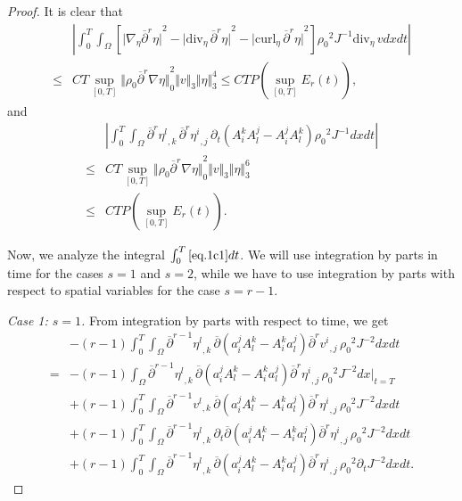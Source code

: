 \documentclass[12pt,twoside,reqno]{amsart}
\numberwithin{equation}{section}
\theoremstyle{definition}
\theoremstyle{remark}
\begin{document}
\begin{proof}
It is clear that
\begin{align*}
  &{\left\vert{{\int_0^T\!\!\!\!\int_\Omega }  \left[{\vert{{\nabla}_\eta {\overline{\partial}}^r\eta}\vert}^2-{\vert{{\mathrm{div}_{\!\eta}\,} {\overline{\partial}}^r \eta}\vert}^2-{\vert{{\mathrm{curl}_\eta\,} {\overline{\partial}}^r \eta}\vert}^2\right]{\rho_0}^2  J^{-1}{\mathrm{div}_{\!\eta}\,} vdxdt}\right\vert}\\
  {\leqslant}& CT\sup_{[0,T]}{\Vert{{\rho_0}  {\overline{\partial}}^r{\nabla}\eta}\Vert}_0^2{\Vert{v}\Vert}_3{\Vert{\eta}\Vert}_3^4
  {\leqslant} CTP(\sup_{[0,T]}E_r(t)),
\end{align*}
and
\begin{align*}
  &{\left\vert{{\int_0^T\!\!\!\!\int_\Omega }  {\overline{\partial}}^r{{{\eta^l}}_{,{k}}\,} {\overline{\partial}}^r {{{\eta^i}}_{,{j}}\,}{\partial}_t(A_i^k A_l^j-A_i^jA_l^k){\rho_0}^2  J^{-1}dxdt}\right\vert}\\
  {\leqslant}& CT\sup_{[0,T]}{\Vert{{\rho_0}  {\overline{\partial}}^r{\nabla}\eta}\Vert}_0^2{\Vert{v}\Vert}_3{\Vert{\eta}\Vert}_3^6\\
  {\leqslant} &CTP(\sup_{[0,T]}E_r(t)).
\end{align*}

Now, we analyze the integral $\int_0^T\eqref{eq.1c1}dt$. We will use integration by parts in time for the cases $s=1$ and $s=2$, while we have to use integration by parts with respect to spatial variables for the case $s=r-1$.

\emph{Case 1: $s=1$.}
From integration by parts with respect to time,  we get
\begin{align}
 &-(r-1){\int_0^T\!\!\!\!\int_\Omega }  {\overline{\partial}}^{r-1}{{{\eta^l}}_{,{k}}\,}{\overline{\partial}} \left(a^j_iA^k_l-A^k_ia^j_l\right){{{{\overline{\partial}}^r v^i}}_{,{j}}\,}{\rho_0}^2  J^{-2}dxdt\label{eq.1c10}\\
  =&-(r-1)\int_\Omega{\overline{\partial}}^{r-1}{{{\eta^l}}_{,{k}}\,}{\overline{\partial}} \left(a^j_iA^k_l-A^k_ia^j_l\right){{{{\overline{\partial}}^r \eta^i}}_{,{j}}\,}{\rho_0}^2  J^{-2}dx\Big|_{t=T}\label{eq.1c11}\\
  &+(r-1){\int_0^T\!\!\!\!\int_\Omega }  {\overline{\partial}}^{r-1}{{{v^l}}_{,{k}}\,}{\overline{\partial}} \left(a^j_iA^k_l-A^k_ia^j_l\right){{{{\overline{\partial}}^r \eta^i}}_{,{j}}\,}{\rho_0}^2  J^{-2}dxdt\label{eq.1c12}\\
  &+(r-1){\int_0^T\!\!\!\!\int_\Omega }  {\overline{\partial}}^{r-1}{{{\eta^l}}_{,{k}}\,}{\partial}_t{\overline{\partial}} \left(a^j_iA^k_l-A^k_ia^j_l\right) {{{{\overline{\partial}}^r \eta^i}}_{,{j}}\,}{\rho_0}^2  J^{-2}dxdt\label{eq.1c13}\\
  &+(r-1){\int_0^T\!\!\!\!\int_\Omega }  {\overline{\partial}}^{r-1}{{{\eta^l}}_{,{k}}\,}{\overline{\partial}} \left(a^j_iA^k_l-A^k_ia^j_l\right){{{{\overline{\partial}}^r \eta^i}}_{,{j}}\,}{\rho_0}^2 {\partial}_t J^{-2}dxdt.\label{eq.1c14}
\end{align}


\end{proof}
\end{document}

